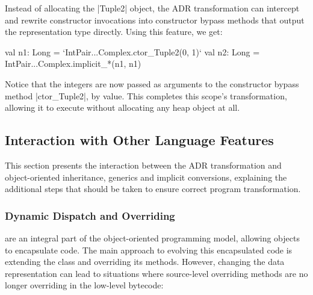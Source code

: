 Instead of allocating the |Tuple2| object, the ADR transformation can intercept and rewrite constructor invocations into constructor bypass methods that output the representation type directly. Using this feature, we get:

\begin{lstlisting-nobreak}
val n1: Long = `IntPair...Complex.ctor_Tuple2(0, 1)`
val n2: Long = IntPair...Complex.implicit_*(n1, n1)
\end{lstlisting-nobreak}

Notice that the integers are now passed as arguments to the constructor bypass method |ctor_Tuple2|, by value. This completes this scope's transformation, allowing it to execute without allocating any heap object at all.




\subsection{Interaction with Other Language Features}
\label{sec:ildl:language-features}

This section presents the interaction between the ADR transformation and object-oriented inheritance, generics and implicit conversions, explaining the additional steps that should be taken to ensure correct program transformation. %

\subsubsection{Dynamic Dispatch and Overriding}
\label{sec:ildl:language-overriding}
are an integral part of the object-oriented programming model, allowing objects to encapsulate code. The main approach to evolving this encapsulated code is extending the class and overriding its methods. However, changing the data representation can lead to situations where source-level overriding methods are no longer overriding in the low-level bytecode:

